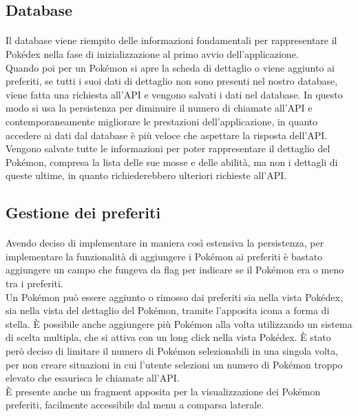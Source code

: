 \documentclass[a4paper,11pt]{article}
\begin{document}
				\subsection{Database}
					\paragraph{}
						Il database viene riempito delle informazioni fondamentali per rappresentare il Pokédex nella fase di inizializzazione al primo avvio dell’applicazione.\\
						Quando poi per un Pokémon si apre la scheda di dettaglio o viene aggiunto ai preferiti, se tutti i suoi dati di dettaglio non sono presenti nel nostro database, viene fatta una richiesta all’API e vengono salvati i dati nel database. In questo modo si usa la persistenza per diminuire il numero di chiamate all’API e contemporaneamente migliorare le prestazioni dell’applicazione, in quanto accedere ai dati dal database è più veloce che aspettare la risposta dell’API.\\
						Vengono salvate tutte le informazioni per poter rappresentare il dettaglio del Pokémon, compresa la lista delle sue mosse e delle abilità, ma non i dettagli di queste ultime, in quanto richiederebbero ulteriori richieste all’API.\\
				\subsection{Gestione dei preferiti}
					\paragraph{}
						Avendo deciso di implementare in maniera così estensiva la persistenza, per implementare la funzionalità di aggiungere i Pokémon ai preferiti è bastato aggiungere un campo che fungeva da flag per indicare se il Pokémon era o meno tra i preferiti.\\
						Un Pokémon può essere aggiunto o rimosso dai preferiti sia nella vista Pokédex, sia nella vista del dettaglio del Pokémon, tramite l’apposita icona a forma di stella. È possibile anche aggiungere più Pokémon alla volta utilizzando un sistema di scelta multipla, che si attiva con un long click nella vista Pokédex. È stato però deciso di limitare il numero di Pokémon selezionabili in una singola volta, per non creare situazioni in cui l’utente selezioni un numero di Pokémon troppo elevato che esaurisca le chiamate all’API.\\
						È presente anche un fragment apposita per la visualizzazione dei Pokémon preferiti, facilmente accessibile dal menu a comparsa laterale.\\
\end{document}
